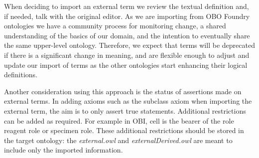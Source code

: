 \documentclass[a4paper,10pt,twocolumn]{article}
\newcommand{\protege}{Prot\'{e}g\'{e}}
\begin{document}
When deciding to import an external term we review the textual definition and, if needed, talk with the original editor.
As we are importing from OBO Foundry ontologies we have a community process for monitoring change, a shared understanding of the basics of our domain, and the intention to eventually share the same upper-level ontology. 
Therefore, we expect that terms will be deprecated if there is a significant change in meaning, and are flexible enough to adjust and update our import of terms as the other ontologies start enhancing their logical definitions.


Another consideration using this approach is the status of assertions made on external terms.
In adding axioms such as the subclass axiom when importing the external term, the aim is to only assert true statements.
Additional restrictions can be added as required.
For example in OBI, cell is the bearer of the role reagent role or specimen role. 
These additional restrictions should be stored in the target ontology: the \emph{external.owl} and \emph{externalDerived.owl} are meant to include only the imported information.
\end{document}
